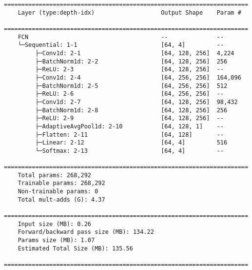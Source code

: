 \newpage
\begin{lstlisting}[caption=\acrfull{fcn}]
    ======================================================================
    Layer (type:depth-idx)                   Output Shape    Param #
    ======================================================================
    FCN                                      --              --
    └─Sequential: 1-1                        [64, 4]         --
         ├─Conv1d: 2-1                       [64, 128, 256]  4,224
         ├─BatchNorm1d: 2-2                  [64, 128, 256]  256
         ├─ReLU: 2-3                         [64, 128, 256]  --
         ├─Conv1d: 2-4                       [64, 256, 256]  164,096
         ├─BatchNorm1d: 2-5                  [64, 256, 256]  512
         ├─ReLU: 2-6                         [64, 256, 256]  --
         ├─Conv1d: 2-7                       [64, 128, 256]  98,432
         ├─BatchNorm1d: 2-8                  [64, 128, 256]  256
         ├─ReLU: 2-9                         [64, 128, 256]  --
         ├─AdaptiveAvgPool1d: 2-10           [64, 128, 1]    --
         ├─Flatten: 2-11                     [64, 128]       --
         ├─Linear: 2-12                      [64, 4]         516
         └─Softmax: 2-13                     [64, 4]         --
    ======================================================================
    Total params: 268,292
    Trainable params: 268,292
    Non-trainable params: 0
    Total mult-adds (G): 4.37
    ======================================================================
    Input size (MB): 0.26
    Forward/backward pass size (MB): 134.22
    Params size (MB): 1.07
    Estimated Total Size (MB): 135.56
    ======================================================================
\end{lstlisting}


